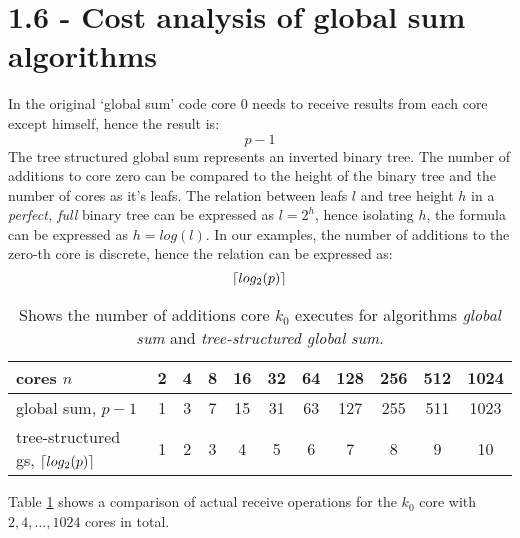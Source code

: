 \documentclass[a4paper,11pt,twoside]{article}
\DeclarePairedDelimiter{\ceil}{\lceil}{\rceil}
\begin{document}
\section{1.6 - Cost analysis of global sum algorithms}
In the original `global sum' code core 0 needs to receive results from each core except himself, hence the result is:
\begin{equation*}
p-1
\end{equation*}
The tree structured global sum represents an inverted binary tree. The number of additions to core zero can be compared to the height of the binary tree and the number of cores as it's leafs. The relation between leafs $l$ and tree height $h$ in a \textit{perfect, full} binary tree can be expressed as $l = 2^{h}$, hence isolating $h$, the formula can be expressed as $h=log(l)$. In our examples, the number of additions to the zero-th core is discrete, hence the relation can be expressed as:
\begin{equation*}
\ceil*{log_{2}(p)}
\end{equation*}

\begin{table}[]
  \centering
  \caption{Shows the number of additions core $k_{0}$ executes for algorithms \textit{global sum} and \textit{tree-structured global sum}.}
  \label{tab:globalsums}
  \begin{tabular}{lcccccccccc}
    cores $n$                            & 2 & 4 & 8 & 16 & 32 & 64 & 128 & 256 & 512 & 1024 \\ \hline
    global sum, $p-1$                    & 1 & 3 & 7 & 15 & 31 & 63 & 127 & 255 & 511 & 1023 \\
    tree-structured gs, $\ceil*{log_{2}(p)}$ & 1 & 2 & 3 & 4  & 5  & 6  & 7   & 8   & 9   & 10
\end{tabular}
\end{table}

Table \ref{tab:globalsums} shows a comparison of actual receive operations for the $k_{0}$ core with $2, 4,...,1024$ cores in total.


\end{document}
